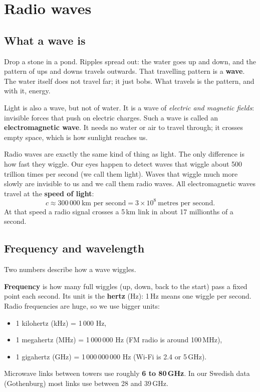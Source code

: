 \documentclass[11pt,a4paper]{article}
\begin{document}
\section{Radio waves}
\label{sec:waves}

\subsection{What a wave is}

Drop a stone in a pond. Ripples spread out: the water goes up and down, and the pattern of ups and
downs travels outwards. That travelling pattern is a \textbf{wave}. The water itself does not travel
far; it just bobs. What travels is the pattern, and with it, energy.

Light is also a wave, but not of water. It is a wave of \emph{electric and magnetic fields}: invisible
forces that push on electric charges. Such a wave is called an \textbf{electromagnetic wave}. It
needs no water or air to travel through; it crosses empty space, which is how sunlight reaches us.

Radio waves are exactly the same kind of thing as light. The only difference is how fast they
wiggle. Our eyes happen to detect waves that wiggle about 500 trillion times per second (we call
them light). Waves that wiggle much more slowly are invisible to us and we call them radio waves.
All electromagnetic waves travel at the \textbf{speed of light}:
\[
c \approx 300\,000\ \text{km per second} = 3\times10^{8}\ \text{metres per second}.
\]
At that speed a radio signal crosses a 5\,km link in about 17 millionths of a second.

\subsection{Frequency and wavelength}

Two numbers describe how a wave wiggles.

\textbf{Frequency} is how many full wiggles (up, down, back to the start) pass a fixed point each
second. Its unit is the \textbf{hertz} (Hz): 1\,Hz means one wiggle per second. Radio frequencies are
huge, so we use bigger units:
\begin{itemize}
  \item 1 kilohertz (kHz) = 1\,000 Hz,
  \item 1 megahertz (MHz) = 1\,000\,000 Hz (FM radio is around 100\,MHz),
  \item 1 gigahertz (GHz) = 1\,000\,000\,000 Hz (Wi-Fi is 2.4 or 5\,GHz).
\end{itemize}
Microwave links between towers use roughly \textbf{6 to 80\,GHz}. In our Swedish data (Gothenburg)
most links use between 28 and 39\,GHz.
\end{document}
